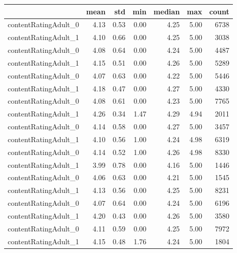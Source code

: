 \begin{tabular}{lrrrrrr}
\toprule
{} &  mean &  std &  min &  median &  max &  count \\
\midrule
contentRatingAdult\_0 & 4.13 & 0.53 & 0.00 & 4.25 & 5.00 &  6738 \\
contentRatingAdult\_1 & 4.10 & 0.66 & 0.00 & 4.25 & 5.00 &  3038 \\
contentRatingAdult\_0 & 4.08 & 0.64 & 0.00 & 4.24 & 5.00 &  4487 \\
contentRatingAdult\_1 & 4.15 & 0.51 & 0.00 & 4.26 & 5.00 &  5289 \\
contentRatingAdult\_0 & 4.07 & 0.63 & 0.00 & 4.22 & 5.00 &  5446 \\
contentRatingAdult\_1 & 4.18 & 0.47 & 0.00 & 4.27 & 5.00 &  4330 \\
contentRatingAdult\_0 & 4.08 & 0.61 & 0.00 & 4.23 & 5.00 &  7765 \\
contentRatingAdult\_1 & 4.26 & 0.34 & 1.47 & 4.29 & 4.94 &  2011 \\
contentRatingAdult\_0 & 4.14 & 0.58 & 0.00 & 4.27 & 5.00 &  3457 \\
contentRatingAdult\_1 & 4.10 & 0.56 & 1.00 & 4.24 & 4.98 &  6319 \\
contentRatingAdult\_0 & 4.14 & 0.52 & 1.00 & 4.26 & 4.98 &  8330 \\
contentRatingAdult\_1 & 3.99 & 0.78 & 0.00 & 4.16 & 5.00 &  1446 \\
contentRatingAdult\_0 & 4.06 & 0.63 & 0.00 & 4.21 & 5.00 &  1545 \\
contentRatingAdult\_1 & 4.13 & 0.56 & 0.00 & 4.25 & 5.00 &  8231 \\
contentRatingAdult\_0 & 4.07 & 0.64 & 0.00 & 4.24 & 5.00 &  6196 \\
contentRatingAdult\_1 & 4.20 & 0.43 & 0.00 & 4.26 & 5.00 &  3580 \\
contentRatingAdult\_0 & 4.11 & 0.59 & 0.00 & 4.25 & 5.00 &  7972 \\
contentRatingAdult\_1 & 4.15 & 0.48 & 1.76 & 4.24 & 5.00 &  1804 \\
\bottomrule
\end{tabular}
